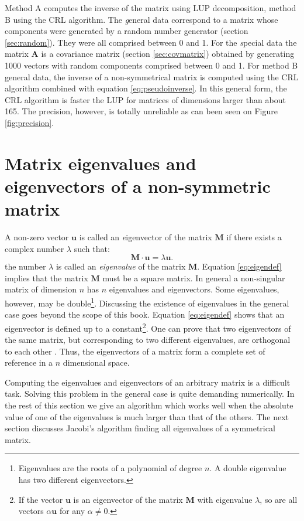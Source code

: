 Method A computes the inverse of the matrix using LUP
decomposition, method B using the CRL algorithm. The {\textsl general}
data correspond to a matrix whose components were generated by a
random number generator (\cf section \ref{sec:random}). They were
all comprised between 0 and 1. For the {\textsl special} data the
matrix $\textbf{A}$ is a covariance matrix (\cf section
\ref{sec:covmatrix}) obtained by generating 1000 vectors with
random components comprised between 0 and 1. For method B general
data, the inverse of a non-symmetrical matrix is computed using
the CRL algorithm combined with equation \ref{eq:pseudoinverse}.
In this general form, the CRL algorithm is faster the LUP for
matrices of dimensions larger than about 165. The precision,
however, is totally unreliable as can been seen on Figure
\ref{fig:precision}.

\section{Matrix eigenvalues and eigenvectors of a non-symmetric matrix}
\label{sec:eigen} A non-zero vector $\textbf{u}$ is called an {\textsl eigenvector} of the matrix $\textbf{M}$ if there exists a complex number $\lambda$ such that:
\begin{equation}
\label{eq:eigendef}
 \textbf{M}\cdot\textbf{u}=\lambda\textbf{u}.
\end{equation}
the number $\lambda$ is called an \textsl{eigenvalue} of the matrix
$\textbf{M}$. Equation \ref{eq:eigendef} implies that the matrix
$\textbf{M}$ must be a square matrix. In general a non-singular
matrix of dimension $n$ has $n$ eigenvalues and eigenvectors. Some
eigenvalues, however, may be double\footnote{Eigenvalues are the
roots of a polynomial of degree $n$. A double eigenvalue has two
different eigenvectors.}. Discussing the existence of eigenvalues
in the general case goes beyond the scope of this book. Equation
\ref{eq:eigendef} shows that an eigenvector is defined up to a
constant\footnote{If the vector $\textbf{u}$ is an eigenvector of the
matrix $\textbf{M}$ with eigenvalue $\lambda$, so are all vectors
$\alpha\textbf{u}$ for any $\alpha\ne 0$.}. One can prove that two
eigenvectors of the same matrix, but corresponding to two
different eigenvalues, are orthogonal to each other \cite{Bass}.
Thus, the eigenvectors of a matrix form a complete set of
reference in a $n$ dimensional space.

Computing the eigenvalues and eigenvectors of an arbitrary matrix
is a difficult task. Solving this problem in the general case is
quite demanding numerically. In the rest of this section we give
an algorithm which works well when the absolute value of one of
the eigenvalues is much larger than that of the others. The next
section discusses Jacobi's algorithm finding all eigenvalues of a
symmetrical matrix.

